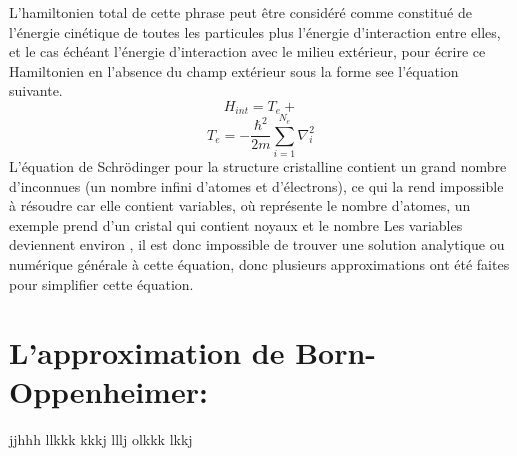 L'hamiltonien total de cette phrase peut être considéré comme constitué de l'énergie cinétique de toutes les particules plus l'énergie d'interaction entre elles, et le cas échéant l'énergie d'interaction avec le milieu extérieur, pour écrire ce Hamiltonien en l'absence du champ extérieur sous la forme see l'équation suivante.
\begin{equation}\label{2-2}
	H_{int} = T_{e}+
\end{equation}
\begin{equation}\label{key}
	T_{e}= -\dfrac{\hbar^{2}}{2m}\sum_{i=1}^{N_{e}}\nabla_{i}^{2}
\end{equation}
L'équation de Schrödinger pour la structure cristalline contient un grand nombre d'inconnues (un nombre infini d'atomes et d'électrons), ce qui la rend impossible à résoudre car elle contient  variables, où  représente le nombre d'atomes, un exemple prend  d'un cristal qui contient  noyaux et le nombre Les variables deviennent environ , il est donc impossible de trouver une solution analytique ou numérique générale à cette équation, donc plusieurs approximations ont été faites pour simplifier cette équation.
\section{L’approximation de Born-Oppenheimer:}

jjhhh
llkkk
kkkj
lllj
olkkk
lkkj